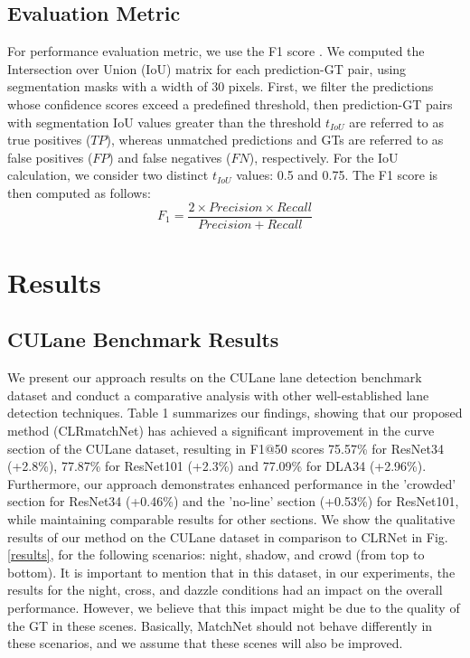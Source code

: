 \documentclass[10pt,twocolumn,letterpaper]{article}
\begin{document}
\subsection{\textbf{Evaluation Metric}} 
For performance evaluation metric, we use the F1 score \cite{CULane_F1}. We computed the Intersection over Union (IoU) matrix for each prediction-GT pair, using segmentation masks with a width of 30 pixels. First, we filter the predictions whose confidence scores exceed a predefined threshold, then prediction-GT pairs with segmentation IoU values greater than the threshold  $t_{IoU}$ are referred to as true positives ($TP$), whereas unmatched predictions and GTs are referred to as false positives ($FP$) and false negatives ($FN$), respectively. For the IoU calculation, we consider two distinct $t_{IoU}$ values: 0.5 and 0.75. The F1 score is then computed as follows:
\begin{equation}
\label{F1score}
\tag{4} F_1=\frac{2\times Precision \times Recall}{Precision+Recall}
\end{equation}
\section{Results}
\subsection{CULane Benchmark Results}
We present our approach results on the CULane lane detection benchmark dataset and conduct a comparative analysis with other well-established lane detection techniques. Table 1 summarizes our findings, showing that our proposed method (CLRmatchNet) has achieved a significant improvement in the curve section of the CULane dataset, resulting in F1$@$50 scores 75.57\% for ResNet34 (+2.8\%), 77.87\% for ResNet101 (+2.3\%) and 77.09\% for DLA34 (+2.96\%). Furthermore, our approach demonstrates enhanced performance in the 'crowded' section for ResNet34 (+0.46\%) and the 'no-line' section (+0.53\%) for ResNet101, while maintaining comparable results for other sections. We show the qualitative results of our method on the CULane dataset in comparison to CLRNet in Fig.\ref{results}, for the following scenarios: night, shadow, and crowd (from top to bottom). It is important to mention that in this dataset, in our experiments, the results for the night, cross, and dazzle conditions had an impact on the overall performance. However, we believe that this impact might be due to the quality of the GT in these scenes. Basically, MatchNet should not behave differently in these scenarios, and we assume that these scenes will also be improved. 
\end{document}

